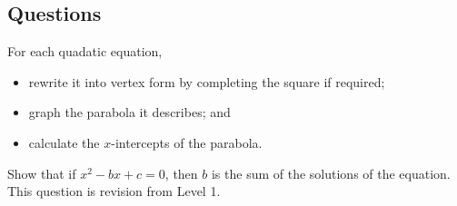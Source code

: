 \clearpage
\subsection*{Questions}
\begin{questions}
  \question For each quadatic equation,
            \begin{itemize}
              \item rewrite it into vertex form by completing the square if required;
              \item graph the parabola it describes; and
              \item calculate the $ x$-intercepts of the parabola.
            \end{itemize}
  \question Show that if $ x^2 - bx + c = 0 $, then $ b $ is the sum of the solutions of the equation.
  \question This question is revision from Level 1.
\end{questions}
